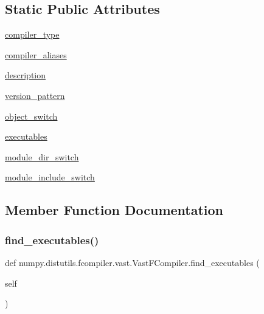 \subsection*{Static Public Attributes}
\begin{DoxyCompactItemize}
\item 
\hyperlink{classnumpy_1_1distutils_1_1fcompiler_1_1vast_1_1VastFCompiler_a699bf233f748c3101917989b0306d1a4}{compiler\+\_\+type}
\item 
\hyperlink{classnumpy_1_1distutils_1_1fcompiler_1_1vast_1_1VastFCompiler_a898a5feb3318545fef0a6830599c7ca4}{compiler\+\_\+aliases}
\item 
\hyperlink{classnumpy_1_1distutils_1_1fcompiler_1_1vast_1_1VastFCompiler_a32c7a2d1661a3db57764f614a7cc7825}{description}
\item 
\hyperlink{classnumpy_1_1distutils_1_1fcompiler_1_1vast_1_1VastFCompiler_adc2d1c2323acd1670244315b7cd73a14}{version\+\_\+pattern}
\item 
\hyperlink{classnumpy_1_1distutils_1_1fcompiler_1_1vast_1_1VastFCompiler_ac4d4903038e683e679a2295eea06be5c}{object\+\_\+switch}
\item 
\hyperlink{classnumpy_1_1distutils_1_1fcompiler_1_1vast_1_1VastFCompiler_ad99477137d6cde2fdc59ff50e2a22214}{executables}
\item 
\hyperlink{classnumpy_1_1distutils_1_1fcompiler_1_1vast_1_1VastFCompiler_af5de009f86e31724990b1ee947fd5b50}{module\+\_\+dir\+\_\+switch}
\item 
\hyperlink{classnumpy_1_1distutils_1_1fcompiler_1_1vast_1_1VastFCompiler_a89a71f5b5a7b78520f74022eecc09a19}{module\+\_\+include\+\_\+switch}
\end{DoxyCompactItemize}


\subsection{Member Function Documentation}
\mbox{\label{classnumpy_1_1distutils_1_1fcompiler_1_1vast_1_1VastFCompiler_a804d1f16bc07aa383f37f075ef9e8fe3}} 
\subsubsection{\texorpdfstring{find\+\_\+executables()}{find\_executables()}}
{\footnotesize\ttfamily def numpy.\+distutils.\+fcompiler.\+vast.\+Vast\+F\+Compiler.\+find\+\_\+executables (\begin{DoxyParamCaption}\item[{}]{self }\end{DoxyParamCaption})}

